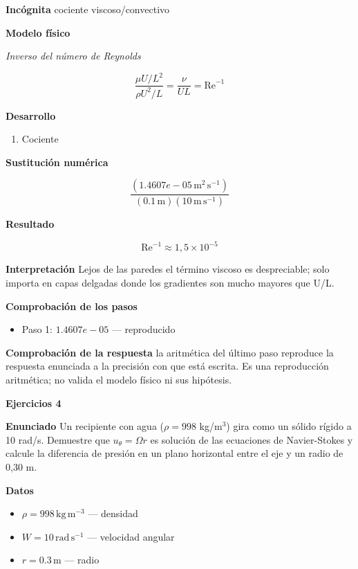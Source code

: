 \documentclass[10pt,openany]{book}
\begin{document}
\noindent\textbf{Incógnita}
cociente viscoso/convectivo

\noindent\textbf{Modelo físico}

\noindent\textit{Inverso del número de Reynolds}

\[
\frac{\mu U/L^{2}}{\rho U^{2}/L} = \frac{\nu}{U L} = \mathrm{Re}^{-1}
\]

\noindent\textbf{Desarrollo}
\begin{enumerate}
\item
Cociente
\end{enumerate}

\noindent\textbf{Sustitución numérica}

\[
\frac{\left(1.4607e-05\,\mathrm{m}^{2}\,\mathrm{s}^{-1}\right)}{\left(0.1\,\mathrm{m}\right) \left(10\,\mathrm{m}\,\mathrm{s}^{-1}\right)}
\]

\noindent\textbf{Resultado}

\[
\mathrm{Re}^{-1} \approx 1{,}5\times 10^{-5}
\]

\noindent\textbf{Interpretación}
Lejos de las paredes el término viscoso es despreciable; solo importa en capas delgadas donde los gradientes son mucho mayores que U/L.

\noindent\textbf{Comprobación de los pasos}
\begin{itemize}
\item Paso 1: $1.4607e-05$ — reproducido
\end{itemize}

\noindent\textbf{Comprobación de la respuesta} la aritmética del último paso reproduce la respuesta enunciada a la precisión con que está escrita. Es una reproducción aritmética; no valida el modelo físico ni sus hipótesis.

\noindent\textbf{Ejercicios 4}

\noindent\textbf{Enunciado}
Un recipiente con agua (\(\rho = 998\) kg/m\(^3\)) gira como un sólido rígido a 10 rad/s. Demuestre que \(u_\theta = \Omega r\) es solución de las ecuaciones de Navier-Stokes y calcule la diferencia de presión en un plano horizontal entre el eje y un radio de 0,30 m.

\noindent\textbf{Datos}
\begin{itemize}
\item $\rho = 998\,\mathrm{kg}\,\mathrm{m}^{-3}$ — densidad
\item $W = 10\,\mathrm{rad}\,\mathrm{s}^{-1}$ — velocidad angular
\item $r = 0.3\,\mathrm{m}$ — radio
\end{itemize}
\end{document}
